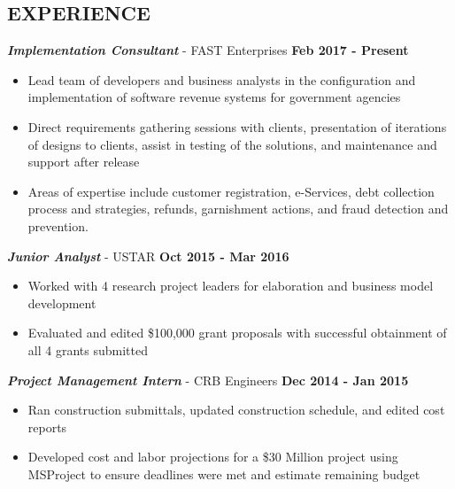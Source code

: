 \documentclass[margin, 10pt]{res} %
\begin{document}
\begin{resume}


\begin{center}
	\section{\textbf{EXPERIENCE}}
\end{center}
\vspace{-.75cm}
{\sl \textbf{Implementation Consultant}} - FAST Enterprises \hfill \textbf{Feb 2017 - Present}
\begin{itemize} \itemsep -2pt %
	\item Lead team of developers and business analysts in the configuration and implementation of software revenue systems for government agencies
	\item Direct requirements gathering sessions with clients, presentation of iterations of designs to clients, assist in testing of the solutions, and maintenance and support after release	
	\item Areas of expertise include customer registration, e-Services, debt collection process and strategies, refunds, garnishment actions, and fraud detection and prevention. 
\end{itemize}

\vspace{-.2cm}

{\sl \textbf{Junior Analyst}} - USTAR \hfill \textbf{Oct 2015 - Mar 2016}

\begin{itemize} \itemsep -2pt %
	\item Worked with 4 research project leaders for elaboration and business model development
	\item Evaluated and edited \$100,000 grant proposals with successful obtainment of all 4 grants submitted
\end{itemize}

\vspace{-.2cm}

{\sl \textbf{Project Management Intern}}  -  CRB Engineers \hfill \textbf{Dec 2014 - Jan 2015}
\begin{itemize}  \itemsep -2pt %
	\item Ran construction submittals, updated construction schedule, and edited cost reports
	\item Developed cost and labor projections for a \$30 Million project using MSProject to ensure deadlines were met and estimate remaining budget
\end{itemize}


\end{resume}
\end{document}
